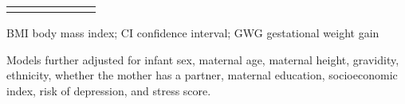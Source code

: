 \documentclass[10pt]{article}
\begin{document}
\begin{landscape}
\begin{table}
\begin{threeparttable}
\begin{tabular}{lcccccc}
\addlinespace[6pt]                                     
\bottomrule
\addlinespace[6pt]
\end{tabular}
\begin{tablenotes}
\item BMI body mass index; CI confidence interval; GWG gestational weight gain
\item Models further adjusted for infant sex, maternal age, maternal height, gravidity, ethnicity, whether the mother has a partner, maternal education, socioeconomic index, risk of depression, and stress score.
\end{tablenotes}                                     

\end{threeparttable}
\end{table}
\end{landscape}
\end{document}
